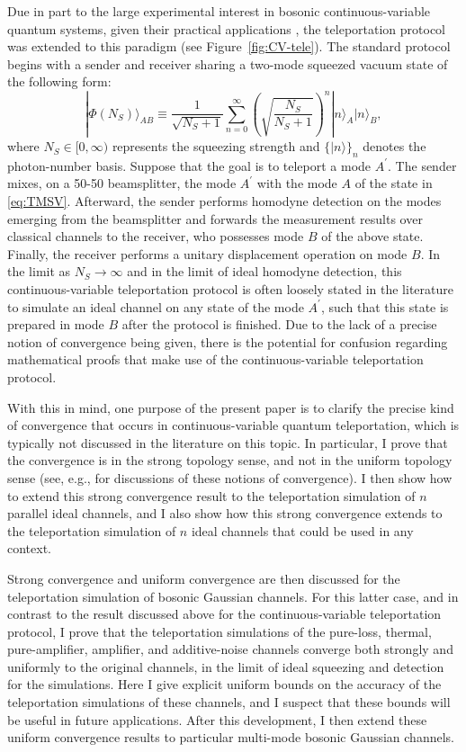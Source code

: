 \documentclass[apsrev,twocolumn]{revtex4-1}%
\begin{document}
Due in part to the large experimental interest in bosonic continuous-variable
quantum systems, given their practical applications \cite{adesso14,S17}, the
teleportation protocol was extended to this paradigm \cite{prl1998braunstein} (see Figure~\ref{fig:CV-tele}).
The standard protocol begins with a sender and receiver sharing a two-mode
squeezed vacuum state of the following form:%
\begin{equation}
|\Phi(N_{S})\rangle_{AB}\equiv\frac{1}{\sqrt{N_{S}+1}}\sum_{n=0}^{\infty
}\left(  \sqrt{\frac{N_{S}}{N_{S}+1}}\right)  ^{n}|n\rangle_{A}|n\rangle_{B} ,
\label{eq:TMSV}%
\end{equation}
where $N_{S}\in\lbrack0,\infty)$ represents the squeezing strength and
$\{|n\rangle\}_{n}$ denotes the photon-number basis. Suppose that the goal is
to teleport a mode $A^{\prime}$. The sender mixes, on a 50-50 beamsplitter,
the mode $A^{\prime}$ with the mode $A$ of the state in \eqref{eq:TMSV}.
Afterward, the sender performs homodyne detection on the modes emerging from
the beamsplitter and forwards the measurement results over classical channels
to the receiver, who possesses mode $B$ of the above state. Finally, the
receiver performs a unitary displacement operation on mode $B$. In the limit
as $N_{S}\rightarrow\infty$ and in the limit of ideal homodyne detection, this
continuous-variable teleportation protocol is often loosely stated in the
literature to simulate an ideal channel on any state of the mode $A^{\prime}$,
such that this state is prepared in mode $B$ after the protocol is finished.
Due to the lack of a precise notion of convergence being given, there is the
potential for confusion regarding mathematical proofs that make use of the
continuous-variable teleportation protocol.

With this in mind, one purpose of the present paper is to clarify the precise
kind of convergence that occurs in continuous-variable quantum teleportation,
which is typically not discussed in the literature on this topic. In
particular, I prove that the convergence is in the strong topology sense, and
not in the uniform topology sense (see, e.g., \cite[Section~3]{SH08} for
discussions of these notions of convergence). I then show how to extend this
strong convergence result to the teleportation simulation of $n$ parallel
ideal channels, and I also show how this strong convergence extends to the
teleportation simulation of $n$ ideal channels that could be used in any context.

Strong convergence and uniform convergence are then discussed for the
teleportation simulation of bosonic Gaussian channels. For this latter case,
and in contrast to the result discussed above for the continuous-variable
teleportation protocol, I prove that the teleportation simulations of the
pure-loss, thermal, pure-amplifier, amplifier, and additive-noise channels
converge both strongly and uniformly to the original channels, in the limit of
ideal squeezing and detection for the simulations. Here I give explicit
uniform bounds on the accuracy of the teleportation simulations of these
channels, and I suspect that these bounds will be useful in future applications.
After this development, I then extend these uniform convergence results to particular multi-mode bosonic Gaussian channels.
\end{document}
